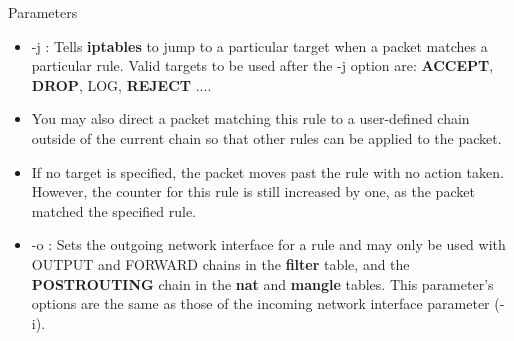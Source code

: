 \begin{frame}[t]{Parameters}
  \fontsize{14}{16}\selectfont
  \begin{itemize}
    \item {\ttfamily -j} : Tells \textcolor{CommandGreen}{\bfseries iptables} to jump to a particular target when a packet matches a particular rule. Valid targets to be used after the {\ttfamily -j} option are: \textcolor{WarningColor}{\bfseries ACCEPT}, \textcolor{WarningColor}{\bfseries DROP}, LOG, \textcolor{WarningColor}{\bfseries REJECT} ....
    \item You may also direct a packet matching this rule to a user-defined chain outside of the current chain so that other rules can be applied to the packet.
    \item If no target is specified, the packet moves past the rule with no action taken. However, the counter for this rule is still increased by one, as the packet matched the specified rule.
    \item {\ttfamily -o} : Sets the outgoing network interface for a rule and may only be used with OUTPUT and FORWARD chains in the \textcolor{CommandGreen}{\bfseries filter} table, and the \textcolor{WarningColor}{\bfseries POSTROUTING} chain in the \textcolor{CommandGreen}{\bfseries nat} and \textcolor{CommandGreen}{\bfseries mangle} tables. This parameter's options are the same as those of the incoming network interface parameter ({\ttfamily -i}).
  \end{itemize}
\end{frame}
